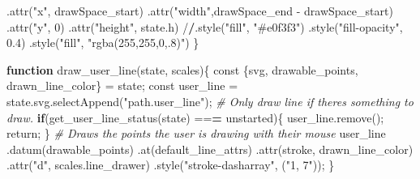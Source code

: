 \documentclass[print]{nuthesis}
\newenvironment{Shaded}{\begin{snugshade}}{\end{snugshade}}
\newcommand{\CommentTok}[1]{\textcolor[rgb]{0.56,0.35,0.01}{\textit{#1}}}
\newcommand{\ControlFlowTok}[1]{\textcolor[rgb]{0.13,0.29,0.53}{\textbf{#1}}}
\newcommand{\DecValTok}[1]{\textcolor[rgb]{0.00,0.00,0.81}{#1}}
\newcommand{\ErrorTok}[1]{\textcolor[rgb]{0.64,0.00,0.00}{\textbf{#1}}}
\newcommand{\FloatTok}[1]{\textcolor[rgb]{0.00,0.00,0.81}{#1}}
\newcommand{\FunctionTok}[1]{\textcolor[rgb]{0.00,0.00,0.00}{#1}}
\newcommand{\NormalTok}[1]{#1}
\newcommand{\OtherTok}[1]{\textcolor[rgb]{0.56,0.35,0.01}{#1}}
\newcommand{\SpecialCharTok}[1]{\textcolor[rgb]{0.00,0.00,0.00}{#1}}
\newcommand{\StringTok}[1]{\textcolor[rgb]{0.31,0.60,0.02}{#1}}
\begin{document}
\begin{Shaded}
\begin{Highlighting}[]
      \FunctionTok{.attr}\NormalTok{(}\StringTok{"x"}\NormalTok{, drawSpace\_start)}
      \FunctionTok{.attr}\NormalTok{(}\StringTok{"width"}\NormalTok{,drawSpace\_end }\SpecialCharTok{{-}}\NormalTok{ drawSpace\_start)}
      \FunctionTok{.attr}\NormalTok{(}\StringTok{"y"}\NormalTok{, }\DecValTok{0}\NormalTok{)}
      \FunctionTok{.attr}\NormalTok{(}\StringTok{"height"}\NormalTok{, state.h)}
      \SpecialCharTok{/}\ErrorTok{/}\FunctionTok{.style}\NormalTok{(}\StringTok{"fill"}\NormalTok{, }\StringTok{"\#e0f3f3"}\NormalTok{)}
      \FunctionTok{.style}\NormalTok{(}\StringTok{"fill{-}opacity"}\NormalTok{, }\FloatTok{0.4}\NormalTok{)}
      \FunctionTok{.style}\NormalTok{(}\StringTok{"fill"}\NormalTok{, }\StringTok{"rgba(255,255,0,.8)"}\NormalTok{)}
\NormalTok{\}}

\ControlFlowTok{function} \FunctionTok{draw\_user\_line}\NormalTok{(state, scales)\{}
\NormalTok{  const \{svg, drawable\_points, drawn\_line\_color\} }\OtherTok{=}\NormalTok{ state;}
\NormalTok{  const user\_line }\OtherTok{=} \FunctionTok{state.svg.selectAppend}\NormalTok{(}\StringTok{"path.user\_line"}\NormalTok{);}
  \CommentTok{\# Only draw line if there\textquotesingle{}s something to draw.}
  \ControlFlowTok{if}\NormalTok{(}\FunctionTok{get\_user\_line\_status}\NormalTok{(state) }\SpecialCharTok{==}\ErrorTok{=} \StringTok{\textquotesingle{}unstarted\textquotesingle{}}\NormalTok{)\{}
    \FunctionTok{user\_line.remove}\NormalTok{();}
\NormalTok{    return;}
\NormalTok{  \}}
  \CommentTok{\# Draws the points the user is drawing with their mouse}
\NormalTok{  user\_line}
      \FunctionTok{.datum}\NormalTok{(drawable\_points)}
      \FunctionTok{.at}\NormalTok{(default\_line\_attrs)}
      \FunctionTok{.attr}\NormalTok{(}\StringTok{\textquotesingle{}stroke\textquotesingle{}}\NormalTok{, drawn\_line\_color)}
      \FunctionTok{.attr}\NormalTok{(}\StringTok{"d"}\NormalTok{, scales.line\_drawer)}
      \FunctionTok{.style}\NormalTok{(}\StringTok{"stroke{-}dasharray"}\NormalTok{, (}\StringTok{"1, 7"}\NormalTok{));}
\NormalTok{\}}


\end{Highlighting}
\end{Shaded}
\end{document}
